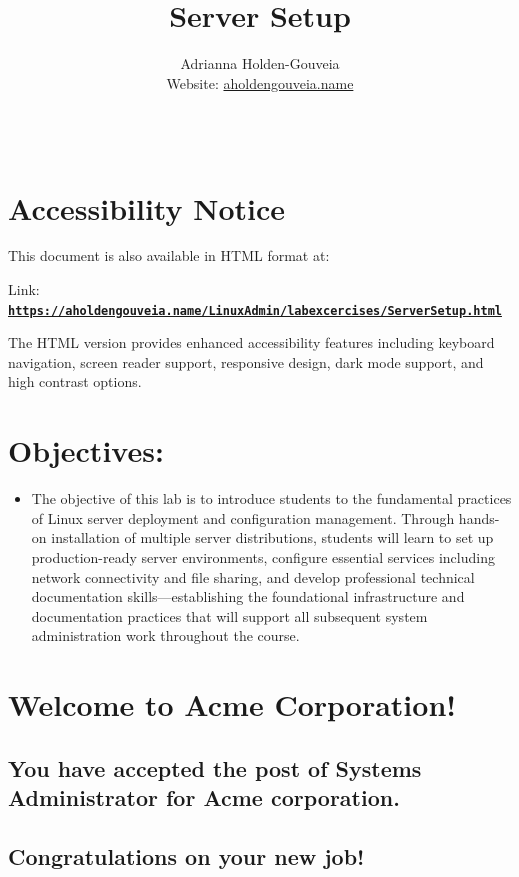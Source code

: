 \documentclass[12pt]{article}
\title{Server Setup}
\author{
        Adrianna Holden-Gouveia \\
        Website: \href{https://aholdengouveia.name}{aholdengouveia.name}\\ 
        \date{\vspace{-5ex}}
        \faGithub {: aholdengouveia} \\
        }
\begin{document}
    

\maketitle



\section*{Accessibility Notice}
This document is also available in HTML format at:

Link: \href{https://aholdengouveia.name/LinuxAdmin/labexcercises/ServerSetup.html}{\textbf{\nolinkurl{https://aholdengouveia.name/LinuxAdmin/labexcercises/ServerSetup.html}}}

The HTML version provides enhanced accessibility features including keyboard navigation, screen reader support, responsive design, dark mode support, and high contrast options.

\section*{Objectives:}
\begin{itemize}
    \item The objective of this lab is to introduce students to the fundamental practices of Linux server deployment and configuration management. Through hands-on installation of multiple server distributions, students will learn to set up production-ready server environments, configure essential services including network connectivity and file sharing, and develop professional technical documentation skills—establishing the foundational infrastructure and documentation practices that will support all subsequent system administration work throughout the course.
\end{itemize}
\section*{Welcome to Acme Corporation!}
\subsection*{You have accepted the post of Systems Administrator for Acme corporation.} 
\subsection*{Congratulations on your new job!}
\end{document}
